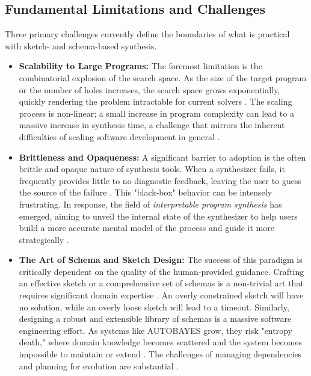 \documentclass[12pt, a4paper]{report}
\begin{document}
\subsection{Fundamental Limitations and Challenges}
Three primary challenges currently define the boundaries of what is practical with sketch- and schema-based synthesis.
\begin{itemize}
    \item \textbf{Scalability to Large Programs:} The foremost limitation is the combinatorial explosion of the search space. As the size of the target program or the number of holes increases, the search space grows exponentially, quickly rendering the problem intractable for current solvers \citep{singh2018interpretable}. The scaling process is non-linear; a small increase in program complexity can lead to a massive increase in synthesis time, a challenge that mirrors the inherent difficulties of scaling software development in general \citep{brooks1987no}.
    \item \textbf{Brittleness and Opaqueness:} A significant barrier to adoption is the often brittle and opaque nature of synthesis tools. When a synthesizer fails, it frequently provides little to no diagnostic feedback, leaving the user to guess the source of the failure \citep{singh2018interpretable}. This "black-box" behavior can be intensely frustrating. In response, the field of \textit{interpretable program synthesis} has emerged, aiming to unveil the internal state of the synthesizer to help users build a more accurate mental model of the process and guide it more strategically \citep{singh2018interpretable}.
    \item \textbf{The Art of Schema and Sketch Design:} The success of this paradigm is critically dependent on the quality of the human-provided guidance. Crafting an effective sketch or a comprehensive set of schemas is a non-trivial art that requires significant domain expertise \citep{singh2018interpretable}. An overly constrained sketch will have no solution, while an overly loose sketch will lead to a timeout. Similarly, designing a robust and extensible library of schemas is a massive software engineering effort. As systems like AUTOBAYES grow, they risk "entropy death," where domain knowledge becomes scattered and the system becomes impossible to maintain or extend \citep{fischer2003autobayes}. The challenges of managing dependencies and planning for evolution are substantial \citep{brooks1987no}.
\end{itemize}
\end{document}
